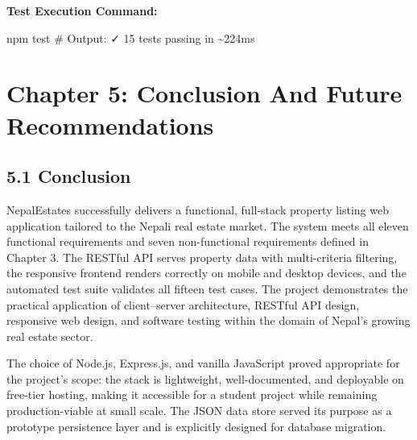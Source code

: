 \documentclass[12pt,a4paper]{report}
\begin{document}
\textbf{Test Execution Command:}

npm test
\# Output: ✓ 15 tests passing in \textasciitilde{}224ms

\chapter{Chapter 5: Conclusion And Future Recommendations}
\section{5.1 Conclusion}
NepalEstates successfully delivers a functional, full-stack property listing web application tailored to the Nepali real estate market. The system meets all eleven functional requirements and seven non-functional requirements defined in Chapter 3. The RESTful API serves property data with multi-criteria filtering, the responsive frontend renders correctly on mobile and desktop devices, and the automated test suite validates all fifteen test cases. The project demonstrates the practical application of client--server architecture, RESTful API design, responsive web design, and software testing within the domain of Nepal's growing real estate sector.

The choice of Node.js, Express.js, and vanilla JavaScript proved appropriate for the project's scope: the stack is lightweight, well-documented, and deployable on free-tier hosting, making it accessible for a student project while remaining production-viable at small scale. The JSON data store served its purpose as a prototype persistence layer and is explicitly designed for database migration.
\end{document}
